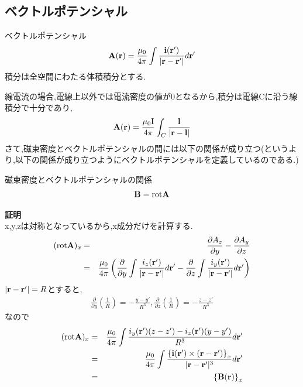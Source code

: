 \documentclass{jsarticle}
\begin{document}
\subsection{ベクトルポテンシャル}
\begin{itembox}[c]{ベクトルポテンシャル}
\begin{eqnarray}
{\bf A}({\bf r})=\frac{\mu_0}{4 \pi} \int \frac{{\bf i}({\bf r'})}{|{\bf r}-{\bf r'}|} d{\bf r'}
\end{eqnarray}
積分は全空間にわたる体積積分とする.
\end{itembox}
線電流の場合,電線上以外では電流密度の値が0となるから,積分は電線Cに沿う線積分で十分であり,
\begin{eqnarray*}
{\bf A}({\bf r})=\frac{\mu_0 {\rm I}}{4 \pi} \int_{C}^{} \frac{{\bf l}}{|{\bf r}-{\bf l}|}
\end{eqnarray*}
さて,磁束密度とベクトルポテンシャルの間には以下の関係が成り立つ(というより,以下の関係が成り立つようにベクトルポテンシャルを定義しているのである.)
\begin{itembox}[c]{磁束密度とベクトルポテンシャルの関係}
\begin{eqnarray}
{\bf B}={\rm rot}{\bf A}
\end{eqnarray}
\end{itembox}
\newpage
{\bf 証明} \\
x,y,zは対称となっているから,x成分だけを計算する.
\begin{eqnarray*}
({\rm rot}{\bf A})_x &=& \frac{\partial A_z}{\partial y}-\frac{\partial A_y}{\partial z} \\
&=& \frac{\mu_0}{4 \pi} \left( \frac{\partial}{\partial y} \int \frac{i_z({\bf r'})}{|{\bf r}-{\bf r'}|} d{\bf r'} 
- \frac{\partial}{\partial z} \int \frac{i_y({\bf r'})}{|{\bf r}-{\bf r'}|} d{\bf r'} \right)
\end{eqnarray*}
$|{\bf r}-{\bf r'}|=R$とすると,
\begin{eqnarray*}
\frac{\partial}{\partial y}\left( \frac{1}{R} \right)=-\frac{y-y'}{R^3},\frac{\partial}{\partial z}\left( \frac{1}{R} \right)=-\frac{z-z'}{R^3}
\end{eqnarray*}
なので
\begin{eqnarray*}
({\rm rot}{\bf A})_x &=& \frac{\mu_0}{4 \pi} \int \frac{i_y({\bf r'})(z-z')-i_z({\bf r'})(y-y')}{R^3} d{\bf r'} \\ 
&=& \frac{\mu_0}{4 \pi} \int \frac{\left\{ {\bf i}({\bf r'}) \times ({\bf r}-{\bf r'}) \right\}_x }{|{\bf r}-{\bf r'}|^3} d{\bf r'} \\
&=& \left\{ {\bf B}({\bf r}) \right\}_x
\end{eqnarray*}
\end{document}

